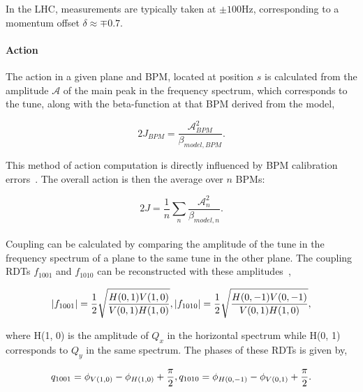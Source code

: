 In the LHC, measurements are typically taken at $\pm 100$Hz, corresponding to a momentum offset 
$\delta \approx \mp0.7$.


\paragraph{Action} 
The action in a given plane and BPM, located at position $s$ is calculated from the amplitude
$\mathcal{A}$ of the main peak in the frequency spectrum, which corresponds to the tune, along with
the beta-function at that BPM derived from the model,

\begin{equation}
    2J_{BPM} = \frac{\mathcal{A}_{BPM}^2}{\beta_{model,BPM}}.
\end{equation}

This method of action computation is directly influenced by BPM calibration
errors~\cite{garcia-tabares_valdivieso_optics-measurement-based_2020}. The overall action is then
the average over $n$ BPMs:

\begin{equation}
    2J = \frac{1}{n} \sum_n \frac{\mathcal{A}_n^2}{\beta_{model,n}}.
\end{equation}


\paragraph{}

Coupling can be calculated by comparing the amplitude of the tune in the frequency spectrum of a
plane to the same tune in the other plane. The coupling RDTs $f_{1001}$ and $f_{1010}$ can be
reconstructed with these amplitudes~\cite{franchi_computation_2010,tomas_cern_2010},

\begin{equation}
   |f_{1001}|  = \frac{1}{2} \sqrt{\frac{H(0,1)V(1,0)}{V(0,1)H(1,0)}}, \\
   |f_{1010}|  = \frac{1}{2} \sqrt{\frac{H(0,-1)V(0,-1)}{V(0,1)H(1,0)}},
\end{equation}

where H(1, 0) is the amplitude of $Q_x$ in the horizontal spectrum while H(0, 1) corresponds to
$Q_y$ in the same spectrum. The phases of these RDTs is given by,

\begin{equation}
    q_{1001} = \phi_{V(1,0)}  - \phi_{H(1,0)} + \frac{\pi}{2}, \\
    q_{1010} = \phi_{H(0,-1)} - \phi_{V(0,1)} + \frac{\pi}{2}.
\end{equation}

